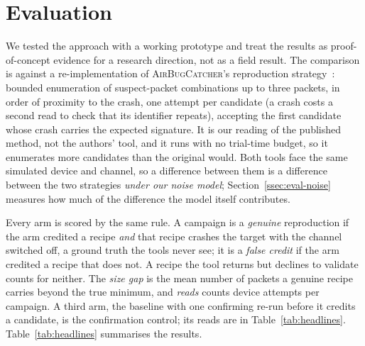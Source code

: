 \section{Evaluation}\label{sec:evaluation}

We tested the approach with a working prototype and treat the results as
proof-of-concept evidence for a research direction, not as a field result. The
comparison is against a re-implementation of \textsc{AirBugCatcher}'s reproduction
strategy~\cite{airbugcatcher2024}: bounded enumeration of suspect-packet
combinations up to three packets, in order of proximity to the crash, one
attempt per candidate (a crash costs a second read to check that its identifier
repeats), accepting the first candidate whose crash carries the expected
signature. It is our reading of the published method, not the authors'
tool, and it runs with no trial-time budget, so it enumerates more candidates
than the original would. Both tools face the same simulated device and channel,
so a difference between them is a difference between the two strategies
\emph{under our noise model}; Section~\ref{ssec:eval-noise} measures how much of
the difference the model itself contributes.

Every arm is scored by the same rule. A campaign is a \emph{genuine} reproduction
if the arm credited a recipe \emph{and} that recipe crashes the target with the
channel switched off, a ground truth the tools never see; it is a \emph{false
credit} if the arm credited a recipe that does not. A recipe the tool returns but
declines to validate counts for neither. The \emph{size gap} is the mean number of
packets a genuine recipe carries beyond the true minimum, and \emph{reads} counts
device attempts per campaign. A third arm, the baseline with one confirming
re-run before it credits a candidate, is the confirmation control; its reads are in
Table~\ref{tab:headlines}.
Table~\ref{tab:headlines} summarises the results.

